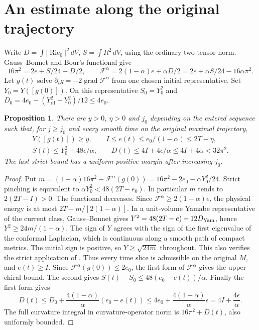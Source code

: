 \documentclass[11pt,letterpaper]{article}
\newtheorem{proposition}[theorem]{Proposition}
\DeclareMathOperator{\Ric}{Ric}
\newcommand{\Yrd}{Y_{\mathrm{rd}}}
\newcommand{\F}{\mathcal F}
\newcommand{\dV}{\,dV}
\begin{document}
\section{An estimate along the original trajectory}
Write \(D=\int|\Ric_0|^2\dV\), \(S=\int R^2\dV\), using the ordinary
two-tensor norm. Gauss--Bonnet and Bour's functional give
\[
 16\pi^2=2e+S/24-D/2,\qquad
 \F^\alpha=2(1-\alpha)e+\alpha D/2
           =2e+\alpha S/24-16\alpha\pi^2 .
\]
Let \(g(t)\) solve \(\partial_tg=-2\operatorname{grad}\F^\alpha\)
from one chosen initial representative. Set \(Y_0=Y([g(0)])\).
On this representative \(S_0=Y_0^2\) and
\(D_0=4e_0-(\Yrd^2-Y_0^2)/12\le4e_0\).

\begin{proposition}\label{prop:budget}
There are \(y>0\), \(\eta>0\) and \(j_0\) depending on the
entered sequence such that, for \(j\ge j_0\) and every smooth time on
the original maximal trajectory,
\[
 \begin{gathered}
 Y([g(t)])\ge y,\qquad I\le e(t)\le e_0/(1-\alpha)\le 2T-\eta,\\
 S(t)\le Y_0^2+48\epsilon/\alpha,\qquad
 D(t)\le 4I+4\epsilon/\alpha\le4I+4\alpha<32\pi^2 .
 \end{gathered}
\]
The last strict bound has a uniform positive margin after increasing
\(j_0\).
\end{proposition}
\begin{proof}
Put \(m=(1-\alpha)16\pi^2-\F^\alpha(g(0))
=16\pi^2-2e_0-\alpha Y_0^2/24\). Strict pinching is equivalent to
\(\alpha Y_0^2<48(2T-e_0)\). In particular \(m\) tends to
\(2(2T-I)>0\). The functional decreases. Since \(\F^\alpha\ge2(1-\alpha)e\),
the physical energy is at most \(2T-m/[2(1-\alpha)]\). In a
unit-volume Yamabe representative of the current class, Gauss--Bonnet
gives \(Y^2=48(2T-e)+12D_{\rm Yam}\), hence \(Y^2\ge24m/(1-\alpha)\).
The sign of \(Y\) agrees with the sign of the first eigenvalue of
the conformal Laplacian, which is continuous along a smooth path of
compact metrics. The initial sign is positive, so \(Y\ge\sqrt{24m}\)
throughout. This also verifies the strict application of
\cite[Lemma 4.5]{Bour2010FourthOrderCurvatureFlows}.
Thus every time slice is admissible on the original \(M\), and \(e(t)\ge I\).
Since \(\F^\alpha(g(0))\le2e_0\), the first form of \(\F^\alpha\)
gives the upper chiral bound. The second gives
\(S(t)-S_0\le48(e_0-e(t))/\alpha\).
Finally the first form gives
\[
 D(t)\le D_0+\frac{4(1-\alpha)}{\alpha}(e_0-e(t))
 \le 4e_0+\frac{4(1-\alpha)}{\alpha}\epsilon
 =4I+\frac{4\epsilon}{\alpha}.
\]
The full curvature integral in curvature-operator norm is
\(16\pi^2+D(t)\), also uniformly bounded.
\end{proof}
\end{document}

